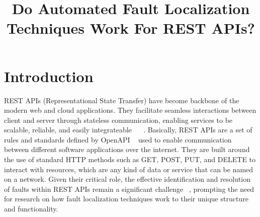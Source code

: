 \documentclass[conference]{IEEEtran}
\begin{document}
\title{Do Automated Fault Localization Techniques Work For REST APIs?}

\author{
\and
{}
\and
{}
}

\maketitle

\begin{abstract}

\end{abstract}

\begin{IEEEkeywords}

\end{IEEEkeywords}


\section{Introduction}
\label{sec:introduction}


    REST APIs (Representational State Transfer) have become backbone of the modern web and cloud applications. 
    They facilitate seamless interactions between client and server through stateless communication, enabling services to be scalable, reliable, and easily integrateable ~\cite{li2016} ~\cite{neumann2018}. 
    Basically, REST APIs are a set of rules and standards  defined by OpenAPI ~\cite{ed-douibi2018} used to enable communication between different software applications over the internet. They are built around the use of standard HTTP methods such as GET, POST, PUT, and DELETE to interact with resources, which are any kind of data or service that can be named on a network.
    Given their critical role, the effective identification and resolution of faults within REST APIs remain a significant challenge ~\cite{barbir2007}, prompting the need for research on how fault localization techniques work to their unique structure and functionality.
\end{document}
